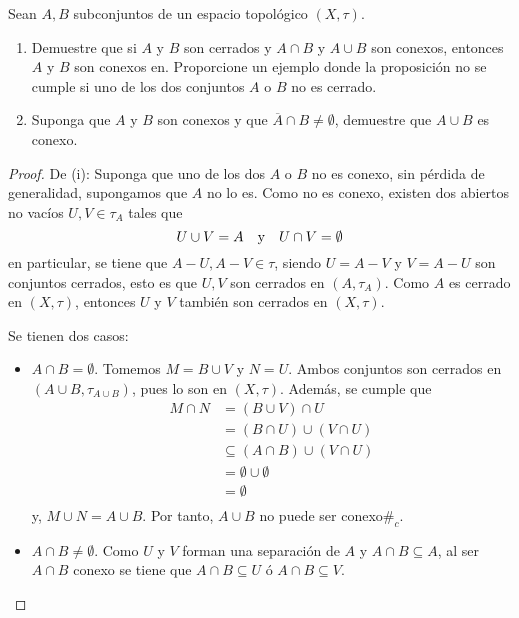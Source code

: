 \documentclass[12pt]{report}
\theoremstyle{largebreak}
\newcommand\contradiction{\ensuremath{\#_c}}
\newcommand{\Cls}[1]{\ensuremath{\overline{#1}}}
\begin{document}
    \begin{excer}
        Sean $A,B$ subconjuntos de un espacio topológico $(X,\tau)$.
        \begin{enumerate}
            \item Demuestre que si $A$ y $B$ son cerrados y $A\cap B$ y $A\cup B$ son conexos, entonces $A$ y $B$ son conexos en. Proporcione un ejemplo donde la proposición no se cumple si uno de los dos conjuntos $A$ o $B$ no es cerrado.
            \item Suponga que $A$ y $B$ son conexos y que $\Cls{A}\cap B\neq\emptyset$, demuestre que $A\cup B$ es conexo.
        \end{enumerate}
    \end{excer}

    \begin{proof}
        De (i): Suponga que uno de los dos $A$ o $B$ no es conexo, sin pérdida de generalidad, supongamos que $A$ no lo es. Como no es conexo, existen dos abiertos no vacíos $U,V\in\tau_A$ tales que
        \begin{equation*}
            U\cup V=A\quad\textup{y}\quad U\cap V=\emptyset
        \end{equation*}
        en particular, se tiene que $A-U,A-V\in\tau$, siendo $U=A-V$ y $V=A-U$ son conjuntos cerrados, esto es que $U,V$ son cerrados en $(A,\tau_A)$. Como $A$ es cerrado en $(X,\tau)$, entonces $U$ y $V$ también son cerrados en $(X,\tau)$.

        Se tienen dos casos:
        \begin{itemize}
            \item $A\cap B=\emptyset$. Tomemos $M=B\cup V$ y $N=U$. Ambos conjuntos son cerrados en $(A\cup B,\tau_{A\cup B})$, pues lo son en $(X,\tau)$. Además, se cumple que
            \begin{equation*}
                \begin{split}
                    M\cap N&=(B\cup V)\cap U\\
                    &=(B\cap U)\cup (V\cap U)\\
                    &\subseteq (A\cap B)\cup(V\cap U)\\
                    &=\emptyset\cup\emptyset\\
                    &=\emptyset\\
                \end{split}
            \end{equation*}
            y, $M\cup N=A\cup B$. Por tanto, $A\cup B$ no puede ser conexo\contradiction.
            \item $A\cap B\neq\emptyset$. Como $U$ y $V$ forman una separación de $A$ y $A\cap B\subseteq A$, al ser $A\cap B$ conexo se tiene que $A\cap B\subseteq U$ ó $A\cap B\subseteq V$.
            

\end{itemize}
\end{proof}
\end{document}
